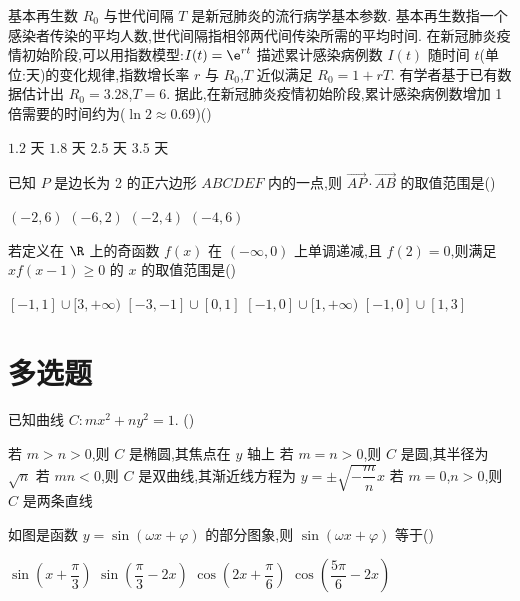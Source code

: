 \begin{problem}
基本再生数 \(R_0\) 与世代间隔 \(T\) 是新冠肺炎的流行病学基本参数. 基本再生数指一个感染者传染的平均人数,世代间隔指相邻两代间传染所需的平均时间. 在新冠肺炎疫情初始阶段,可以用指数模型:\(I(t)=\e^{rt}\) 描述累计感染病例数 \(I(t)\) 随时间 \(t\)(单位:天)的变化规律,指数增长率 \(r\) 与 \(R_0\),\(T\) 近似满足 \(R_0=1+rT\). 有学者基于已有数据估计出 \(R_0=3.28\),\(T=6\). 据此,在新冠肺炎疫情初始阶段,累计感染病例数增加 1 倍需要的时间约为(\(\ln 2\approx 0.69\))(\quad)

\choices
    {\(1.2\) 天}
    {\(1.8\) 天}
    {\(2.5\) 天}
    {\(3.5\) 天}
\end{problem}

\begin{problem}
已知 \(P\) 是边长为 2 的正六边形 \(ABCDEF\) 内的一点,则 \(\overrightarrow{AP}\cdot\overrightarrow{AB}\) 的取值范围是(\quad)

\choices
    {\(\left( -2,6 \right)\)}
    {\(\left( -6,2 \right)\)}
    {\(\left( -2,4 \right)\)}
    {\(\left( -4,6 \right)\)}
\end{problem}

\begin{problem}
若定义在 \(\R\) 上的奇函数 \(f(x)\) 在 \((-\infty,0)\) 上单调递减,且 \(f(2)=0\),则满足 \(xf(x-1)\ge 0\) 的 \(x\) 的取值范围是(\quad)

\choices
    {\([ -1,1]\cup[3,+\infty)\)}
    {\([ -3,-1]\cup[0,1]\)}
    {\([ -1,0]\cup[1,+\infty)\)}
    {\([ -1,0]\cup[1,3]\)}
\end{problem}

\section{多选题}

\begin{problem}
已知曲线 \(C:mx^2+ny^2=1\). (\quad)

\choices
    {若 \(m>n>0\),则 \(C\) 是椭圆,其焦点在 \(y\) 轴上}
    {若 \(m=n>0\),则 \(C\) 是圆,其半径为 \(\sqrt{n}\)}
    {若 \(mn<0\),则 \(C\) 是双曲线,其渐近线方程为 \(y=\pm\sqrt{-\dfrac{m}{n}}x\)}
    {若 \(m=0\),\(n>0\),则 \(C\) 是两条直线}
\end{problem}

\begin{problem}
如图是函数 \(y=\sin(\omega x+\varphi)\) 的部分图象,则 \(\sin(\omega x+\varphi)\) 等于(\quad)

\begin{center}
\end{center}

\choices
    {\(\sin\left( x+\dfrac{\pi}{3} \right)\)}
    {\(\sin\left( \dfrac{\pi}{3}-2x \right)\)}
    {\(\cos\left( 2x+\dfrac{\pi}{6} \right)\)}
    {\(\cos\left( \dfrac{5\pi}{6}-2x \right)\)}
\end{problem}

